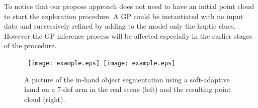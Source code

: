 
To notice that our propose approach does not need to have an initial point cloud to start the exploration procedure. A GP could be instantiated with no input data and successively refined by adding to the model only the haptic clues. However the GP inference process will be affected especially in the earlier stages of the procedure.   

\begin{figure}
\centering
  \mbox{
  \texttt{[image: example.eps]}
  \texttt{[image: example.eps]}
  }
  \caption{A picture of the in-hand object segmentation using a soft-adaptive hand on a 7-dof arm in the real scene (left) and the resulting point cloud (right).}
  \label{fig:in-hand-segmentation}
\end{figure}



